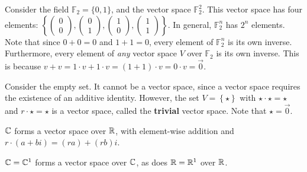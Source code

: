 Consider the field $\mathbb{F}_2 = \{0, 1\}$, and the vector space $\mathbb{F}_2^2$. This vector space has four elements: $\left\{\begin{pmatrix}
        0 \\ 0
    \end{pmatrix}, \begin{pmatrix}
        0 \\ 1
    \end{pmatrix}, \begin{pmatrix}
        1 \\ 0
    \end{pmatrix}, \begin{pmatrix}
        1 \\ 1
    \end{pmatrix}\right\}$. In general, $\mathbb{F}_2^n$ has $2^n$ elements. Note that since $0 + 0 = 0$ and $1 + 1 = 0$, every element of $\mathbb{F}_2^n$ is its own inverse. Furthermore, every element of \textit{any} vector space $V$ over $\mathbb{F}_2$ is its own inverse. This is because $v + v = 1 \cdot v + 1 \cdot v = (1 + 1) \cdot v = 0 \cdot v = \vec{0}$.

Consider the empty set. It cannot be a vector space, since a vector space requires the existence of an additive identity. However, the set $V = \left\{\star\right\}$ with $\star \cdot \star = \star$ and $r \cdot \star = \star$ is a vector space, called the \textbf{trivial} vector space. Note that $\star = \vec{0}$.

\begin{exmp}
    $\mathbb{C}$ forms a vector space over $\mathbb{R}$, with element-wise addition and $r \cdot (a + bi) = (ra) + (rb)i$.
\end{exmp}

\begin{rmk}
    $\mathbb{C} =\mathbb{C}^1$ forms a vector space over $\mathbb{C}$, as does $\mathbb{R} = \mathbb{R}^1$ over $\mathbb{R}$.
\end{rmk}

